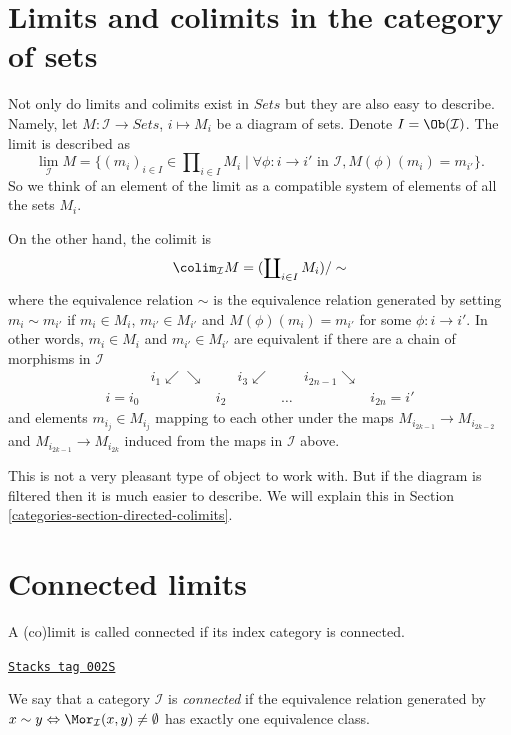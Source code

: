 \section{Limits and colimits in the category of sets}
\label{categories-section-limit-sets}
Not only do limits and colimits exist in $\textit{Sets}$
but they are also easy to describe. Namely, let $M : \mathcal{I}
\to \textit{Sets}$, $i \mapsto M_i$ be a diagram of sets.
Denote $I = \Ob(\mathcal{I})$.
The limit is described as
$$
\lim_\mathcal{I} M
=
\{
(m_i)_{i\in I} \in \prod\nolimits_{i\in I} M_i
\mid
\forall \phi : i \to i' \text{ in }\mathcal{I},
M(\phi)(m_i) = m_{i'}
\}.
$$
So we think of an element of the limit as a compatible system of elements
of all the sets $M_i$.

\medskip\noindent
On the other hand, the colimit is
$$
\colim_\mathcal{I} M
=
(\coprod\nolimits_{i\in I} M_i)/\sim
$$
where the equivalence relation $\sim$ is the equivalence relation
generated by setting $m_i \sim m_{i'}$ if $m_i \in M_i$,
$m_{i'} \in M_{i'}$ and $M(\phi)(m_i) = m_{i'}$ for some
$\phi : i \to i'$. In other words, $m_i \in M_i$
and $m_{i'} \in M_{i'}$ are equivalent if there are a
chain of morphisms in $\mathcal{I}$
$$
\begin{array}{ccccccc} & i_1 \swarrow\searrow &  & i_3 \swarrow &  & i_{2n-1} \searrow &  \\ i = i_0 &  & i_2 &  & \ldots &  & i_{2n} = i'\end{array}
$$
and elements $m_{i_j} \in M_{i_j}$ mapping to each other under
the maps $M_{i_{2k-1}} \to M_{i_{2k-2}}$ and $M_{i_{2k-1}}
\to M_{i_{2k}}$ induced from the maps in $\mathcal{I}$ above.

\medskip\noindent
This is not a very pleasant type of object to work with.
But if the diagram is filtered then it is much easier to
describe. We will explain this in Section \ref{categories-section-directed-colimits}.

\section{Connected limits}
\label{categories-section-connected-limits}
A (co)limit is called connected if its index category is connected.

\begin{definition}
\label{categories-definition-category-connected}
\href{https://stacks.math.columbia.edu/tag/002S}{\texttt{Stacks tag 002S}}

We say that a category $\mathcal{I}$ is {\it connected}
if the equivalence relation generated by
$x \sim y \Leftrightarrow \Mor_\mathcal{I}(x, y) \not = \emptyset$
has exactly one equivalence class.
\end{definition}

